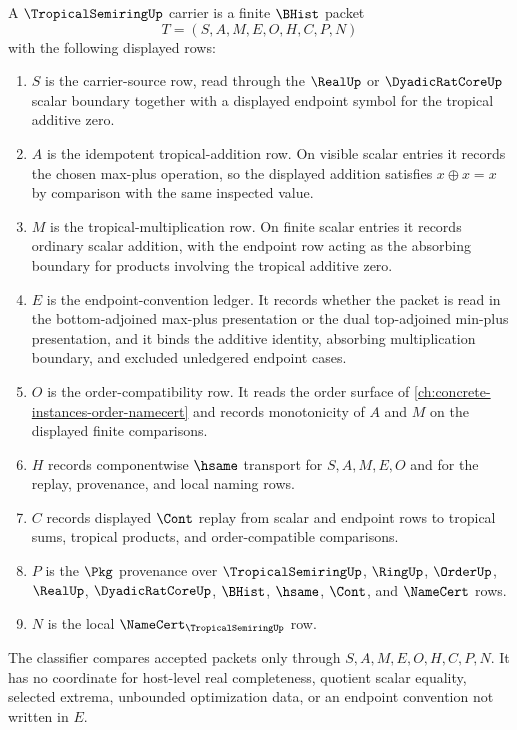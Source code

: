 \begin{definition}
\label{def:tropical-semiring-carrier}
A $\TropicalSemiringUp$ carrier is a finite $\BHist$ packet
$$
T=(S,A,M,E,O,H,C,P,N)
$$
with the following displayed rows:
\begin{enumerate}
\item $S$ is the carrier-source row, read through the $\RealUp$ or $\DyadicRatCoreUp$ scalar boundary together with a displayed endpoint symbol for the tropical additive zero.
\item $A$ is the idempotent tropical-addition row. On visible scalar entries it records the chosen max-plus operation, so the displayed addition satisfies $x \oplus x=x$ by comparison with the same inspected value.
\item $M$ is the tropical-multiplication row. On finite scalar entries it records ordinary scalar addition, with the endpoint row acting as the absorbing boundary for products involving the tropical additive zero.
\item $E$ is the endpoint-convention ledger. It records whether the packet is read in the bottom-adjoined max-plus presentation or the dual top-adjoined min-plus presentation, and it binds the additive identity, absorbing multiplication boundary, and excluded unledgered endpoint cases.
\item $O$ is the order-compatibility row. It reads the order surface of \autoref{ch:concrete-instances-order-namecert} and records monotonicity of $A$ and $M$ on the displayed finite comparisons.
\item $H$ records componentwise $\hsame$ transport for $S,A,M,E,O$ and for the replay, provenance, and local naming rows.
\item $C$ records displayed $\Cont$ replay from scalar and endpoint rows to tropical sums, tropical products, and order-compatible comparisons.
\item $P$ is the $\Pkg$ provenance over $\TropicalSemiringUp$, $\RingUp$, $\OrderUp$, $\RealUp$, $\DyadicRatCoreUp$, $\BHist$, $\hsame$, $\Cont$, and $\NameCert$ rows.
\item $N$ is the local $\NameCert_{\TropicalSemiringUp}$ row.
\end{enumerate}
The classifier compares accepted packets only through $S,A,M,E,O,H,C,P,N$. It has no coordinate for host-level real completeness, quotient scalar equality, selected extrema, unbounded optimization data, or an endpoint convention not written in $E$.
\end{definition}

